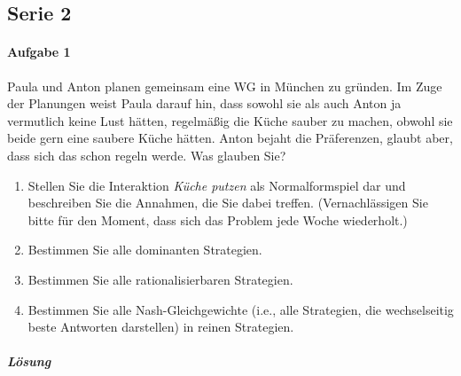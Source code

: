 \subsection{Serie 2}%
\label{sub:serie_2}

\paragraph{Aufgabe 1}%
\label{par:serie_2_aufgabe_1}

Paula und Anton planen gemeinsam eine WG in München zu gründen.
Im Zuge der Planungen weist Paula darauf hin, dass sowohl sie als auch Anton ja vermutlich
keine Lust hätten, regelmäßig die Küche sauber zu machen, obwohl sie beide gern eine
saubere Küche hätten.
Anton bejaht die Präferenzen, glaubt aber, dass sich das schon regeln werde.
Was glauben Sie?

\begin{enumerate}
  \item Stellen Sie die Interaktion \textit{Küche putzen} als Normalformspiel dar und
    beschreiben Sie die Annahmen, die Sie dabei treffen. (Vernachlässigen Sie bitte für
    den Moment, dass sich das Problem jede Woche wiederholt.)

  \item Bestimmen Sie alle dominanten Strategien.

  \item Bestimmen Sie alle rationalisierbaren Strategien.

  \item Bestimmen Sie alle Nash-Gleichgewichte (i.e., alle Strategien, die wechselseitig
    beste Antworten darstellen) in reinen Strategien.
\end{enumerate}

\subparagraph{Lösung}%


